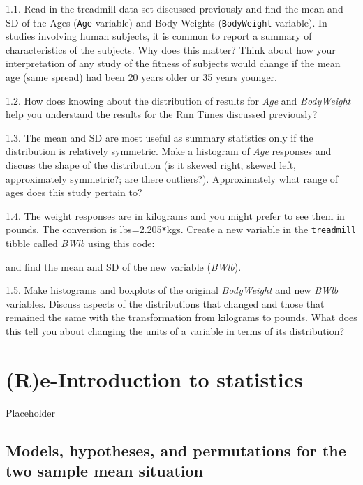\documentclass[]{book}
\newenvironment{Shaded}{\begin{snugshade}}{\end{snugshade}}
\newcommand{\FloatTok}[1]{\textcolor[rgb]{0.00,0.00,0.81}{#1}}
\newcommand{\NormalTok}[1]{#1}
\newcommand{\OperatorTok}[1]{\textcolor[rgb]{0.81,0.36,0.00}{\textbf{#1}}}
\newcommand{\StringTok}[1]{\textcolor[rgb]{0.31,0.60,0.02}{#1}}
\renewenvironment{Shaded}{%
\setlength{\FrameRule}{1.5pt}
\def\FrameCommand{\fboxrule=\FrameRule\fboxsep=5pt 
                  \fcolorbox{framecolor}{shadecolor}}%
\MakeFramed {\FrameRestore}}%
{\endMakeFramed}
\begin{document}
1.1. Read in the treadmill data set
discussed previously and find the mean and SD of the Ages (\texttt{Age} variable) and Body
Weights (\texttt{BodyWeight} variable). In studies involving human subjects, it is
common to report a
summary of characteristics of the subjects. Why does this matter? Think about
how your interpretation of any study of the fitness of subjects would change if
the mean age (same spread) had been 20 years older or 35 years younger.

1.2. How does knowing about the
distribution of results for \emph{Age} and \emph{BodyWeight} help you understand the
results for the Run Times discussed previously?

1.3. The mean and SD are most useful
as summary statistics only if the distribution is relatively symmetric. Make a
histogram of \emph{Age} responses and
discuss the shape of the distribution (is it skewed right, skewed left,
approximately symmetric?; are there outliers?). Approximately what range of
ages does this study pertain to?

1.4. The weight responses are in
kilograms and you might prefer to see them in pounds. The conversion is
lbs=2.205\texttt{*}kgs. Create a new variable in the \texttt{treadmill}
tibble called \emph{BWlb} using this code:

\begin{Shaded}
\end{Shaded}

and find the mean and SD of the new variable (\emph{BWlb}).

1.5. Make histograms and boxplots of
the original \emph{BodyWeight} and new \emph{BWlb} variables. Discuss aspects of the
distributions that changed and those that remained the same with the
transformation from kilograms to pounds. What does this tell you about changing the units of a variable in terms of its distribution?

\hypertarget{chapter2}{%
\chapter{(R)e-Introduction to statistics}\label{chapter2}}

Placeholder

\hypertarget{section2-3}{%
\section{Models, hypotheses, and permutations for the two sample mean situation}\label{section2-3}}
\end{document}
